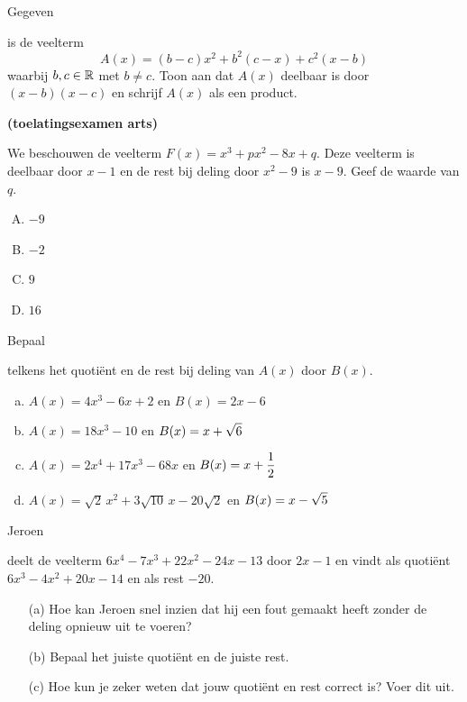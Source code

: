 \documentclass{ximera}
\begin{document}
\begin{exercise} 
\hypertarget{oef3.12}{Gegeven} is de veelterm
\[
A(x) = (b-c)x^2 + b^2(c-x) + c^2(x-b)
\]
waarbij $b,c \in \mathbb{R}$ met $b \neq c$. Toon aan dat $A(x)$ deelbaar is door $(x-b)(x-c)$ en schrijf $A(x)$ als een product. 
\end{exercise} 

\begin{exercise} 
\hypertarget{oef3.13}{{\bf (toelatingsexamen arts)}}
We beschouwen de veelterm $F(x) = x^3 + px^2 - 8x + q$. Deze veelterm is deelbaar door $x-1$ en de rest bij deling door $x^2-9$ is $x-9$. Geef de waarde van $q$.
\begin{multicols}{4} 
\begin{enumerate}[(A)]
\item 
$-9$
\item 
$-2$
\item 
$9$
\item 
$16$
\end{enumerate}
\end{multicols}
\end{exercise} 

\begin{exercise} 
\hypertarget{oef3.14}{Bepaal} telkens het quoti\"ent en de rest bij deling van $A(x)$ door $B(x)$.
\begin{enumerate}[(a)]
\item
$A(x) = 4x^3-6x+2$ \quad en \quad $B(x) = 2x-6$
\item
$A(x) = 18x^3-10$ \quad en \quad $\displaystyle B(x) = x + \sqrt{6}$
\item 
$A(x) = 2x^4 + 17x^3 - 68x$ \quad en \quad $\displaystyle B(x) = x+\frac{1}{2}$
\item 
$A(x) = \sqrt{2}\,x^2 + 3\sqrt{10}\,x - 20\sqrt{2}$ \quad en \quad $\displaystyle B(x) = x - \sqrt{5}$
\end{enumerate}
\end{exercise} 

\begin{exercise} 
\hypertarget{oef3.15}{Jeroen} deelt de veelterm $6x^4-7x^3+22x^2-24x-13$ door $2x-1$ en vindt als quoti\"ent $6x^3-4x^2+20x-14$ en als rest $-20$. 
\begin{enumerate}
\item[(a)]
Hoe kan Jeroen snel inzien dat hij een fout gemaakt heeft zonder de deling opnieuw uit te voeren? 
\item[(b)]
Bepaal het juiste quoti\"ent en de juiste rest.
\item[(c)]
Hoe kun je zeker weten dat jouw quoti\"ent en rest correct is? Voer dit uit.
\end{enumerate}
\end{exercise} 
\end{document}
